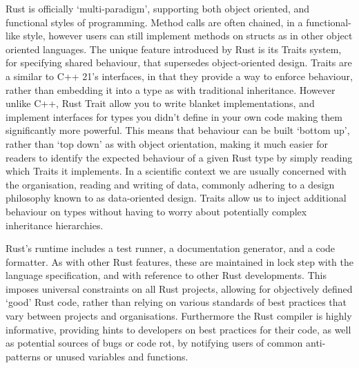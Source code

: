 Rust is officially `multi-paradigm', supporting both object oriented, and functional styles of programming. Method calls are often chained, in a functional-like style, however users can still implement methods on structs as in other object oriented languages. The unique feature introduced by Rust is its Traits system, for specifying shared behaviour, that supersedes object-oriented design. Traits are a similar to C++ 21's interfaces, in that they provide a way to enforce behaviour, rather than embedding it into a type as with traditional inheritance. However unlike C++, Rust Trait allow you to write blanket implementations, and implement interfaces for types you didn't define in your own code making them significantly more powerful. This means that behaviour can be built `bottom up', rather than `top down' as with object orientation, making it much easier for readers to identify the expected behaviour of a given Rust type by simply reading which Traits it implements. In a scientific context we are usually concerned with the organisation, reading and writing of data, commonly adhering to a design philosophy known to as data-oriented design. Traits allow us to inject additional behaviour on types without having to worry about potentially complex inheritance hierarchies.

Rust's runtime includes a test runner, a documentation generator, and a code formatter. As with other Rust features, these are maintained in lock step with the language specification, and with reference to other Rust developments. This imposes universal constraints on all Rust projects, allowing for objectively defined `good' Rust code, rather than relying on various standards of best practices that vary between projects and organisations. Furthermore the Rust compiler is highly informative, providing hints to developers on best practices for their code, as well as potential sources of bugs or code rot, by notifying users of common anti-patterns or unused variables and functions.

